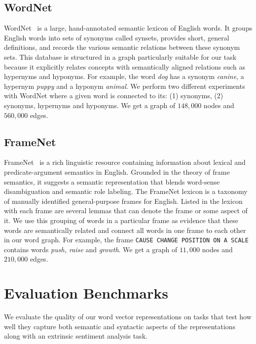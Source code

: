 \documentclass[11pt]{article}
\begin{document}
\subsection{WordNet} 
\label{sec:wordnet}

WordNet~\cite{miller:1995} is a large, hand-annotated semantic lexicon of English words. 
It groups English words into sets of synonyms called synsets, provides short, general definitions, and records the various semantic relations between these synonym sets.
This database is structured in a graph particularly suitable for our task because it explicitly relates concepts with semantically aligned relations such as hypernyms and hyponyms. For example, the word \textit{dog} has a synonym \textit{canine}, a hypernym \textit{puppy} and a hyponym \textit{animal}. We perform two different experiments with WordNet where a given word is connected to
its: (1) synonyms, (2) synonyms, hypernyms and hyponyms. 
We get a graph of $148,000$ nodes and $560,000$ edges.

\subsection{FrameNet}
\label{sec:framenet}

FrameNet~\cite{fillmore-ua-2003} is a rich linguistic resource containing  information about
lexical and predicate-argument semantics in English. Grounded in the theory of frame semantics, it suggests 
a semantic representation that blends word-sense disambiguation and semantic role labeling. The FrameNet lexicon
\cite{Baker:1998:BFP:980845.980860} is a taxonomy of manually identified general-purpose frames for English. 
Listed in the lexicon with each frame are several lemmas that can denote the frame or some aspect of it. 
We use this grouping of words in a particular frame as evidence that these words are semantically related and
connect all words in one frame to each other in our word graph. For example, the frame \texttt{CAUSE CHANGE POSITION ON A SCALE} contains words \textit{push, raise} and \textit{growth}. We get a graph of $11,000$ nodes and $210,000$ edges. 

\section{Evaluation Benchmarks}
\label{sec:eval}

We evaluate the quality of our word vector representations on tasks that
test how well they capture both semantic and syntactic aspects of the representations
along with an extrinsic sentiment analysis task.
\end{document}
